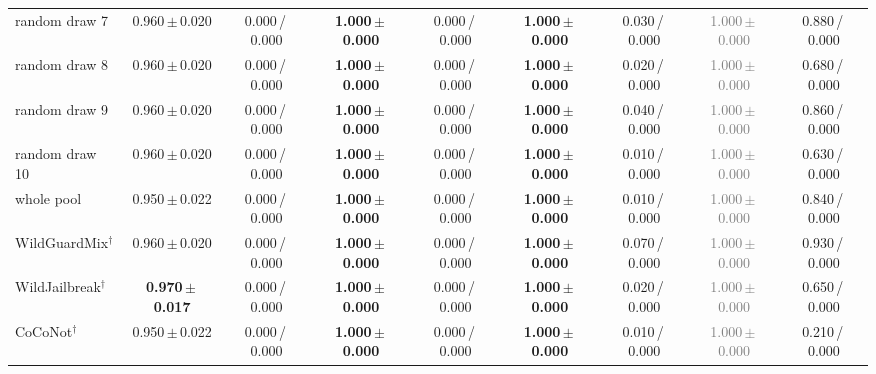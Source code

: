 \begin{tabular}{@{}lcccccccc@{}}
random draw 7 & 0.960\,{\scriptsize$\pm$\,0.020} & {\scriptsize 0.000\,/\,0.000} & \textbf{1.000\,{\scriptsize$\pm$\,0.000}} & {\scriptsize 0.000\,/\,0.000} & \textbf{1.000\,{\scriptsize$\pm$\,0.000}} & {\scriptsize 0.030\,/\,0.000} & \textcolor{gray}{1.000\,{\scriptsize$\pm$\,0.000}} & {\scriptsize 0.880\,/\,0.000} \\
random draw 8 & 0.960\,{\scriptsize$\pm$\,0.020} & {\scriptsize 0.000\,/\,0.000} & \textbf{1.000\,{\scriptsize$\pm$\,0.000}} & {\scriptsize 0.000\,/\,0.000} & \textbf{1.000\,{\scriptsize$\pm$\,0.000}} & {\scriptsize 0.020\,/\,0.000} & \textcolor{gray}{1.000\,{\scriptsize$\pm$\,0.000}} & {\scriptsize 0.680\,/\,0.000} \\
random draw 9 & 0.960\,{\scriptsize$\pm$\,0.020} & {\scriptsize 0.000\,/\,0.000} & \textbf{1.000\,{\scriptsize$\pm$\,0.000}} & {\scriptsize 0.000\,/\,0.000} & \textbf{1.000\,{\scriptsize$\pm$\,0.000}} & {\scriptsize 0.040\,/\,0.000} & \textcolor{gray}{1.000\,{\scriptsize$\pm$\,0.000}} & {\scriptsize 0.860\,/\,0.000} \\
random draw 10 & 0.960\,{\scriptsize$\pm$\,0.020} & {\scriptsize 0.000\,/\,0.000} & \textbf{1.000\,{\scriptsize$\pm$\,0.000}} & {\scriptsize 0.000\,/\,0.000} & \textbf{1.000\,{\scriptsize$\pm$\,0.000}} & {\scriptsize 0.010\,/\,0.000} & \textcolor{gray}{1.000\,{\scriptsize$\pm$\,0.000}} & {\scriptsize 0.630\,/\,0.000} \\
whole pool & 0.950\,{\scriptsize$\pm$\,0.022} & {\scriptsize 0.000\,/\,0.000} & \textbf{1.000\,{\scriptsize$\pm$\,0.000}} & {\scriptsize 0.000\,/\,0.000} & \textbf{1.000\,{\scriptsize$\pm$\,0.000}} & {\scriptsize 0.010\,/\,0.000} & \textcolor{gray}{1.000\,{\scriptsize$\pm$\,0.000}} & {\scriptsize 0.840\,/\,0.000} \\
WildGuardMix$^\dagger$ & 0.960\,{\scriptsize$\pm$\,0.020} & {\scriptsize 0.000\,/\,0.000} & \textbf{1.000\,{\scriptsize$\pm$\,0.000}} & {\scriptsize 0.000\,/\,0.000} & \textbf{1.000\,{\scriptsize$\pm$\,0.000}} & {\scriptsize 0.070\,/\,0.000} & \textcolor{gray}{1.000\,{\scriptsize$\pm$\,0.000}} & {\scriptsize 0.930\,/\,0.000} \\
WildJailbreak$^\dagger$ & \textbf{0.970\,{\scriptsize$\pm$\,0.017}} & {\scriptsize 0.000\,/\,0.000} & \textbf{1.000\,{\scriptsize$\pm$\,0.000}} & {\scriptsize 0.000\,/\,0.000} & \textbf{1.000\,{\scriptsize$\pm$\,0.000}} & {\scriptsize 0.020\,/\,0.000} & \textcolor{gray}{1.000\,{\scriptsize$\pm$\,0.000}} & {\scriptsize 0.650\,/\,0.000} \\
CoCoNot$^\dagger$ & 0.950\,{\scriptsize$\pm$\,0.022} & {\scriptsize 0.000\,/\,0.000} & \textbf{1.000\,{\scriptsize$\pm$\,0.000}} & {\scriptsize 0.000\,/\,0.000} & \textbf{1.000\,{\scriptsize$\pm$\,0.000}} & {\scriptsize 0.010\,/\,0.000} & \textcolor{gray}{1.000\,{\scriptsize$\pm$\,0.000}} & {\scriptsize 0.210\,/\,0.000} \\

\end{tabular}
